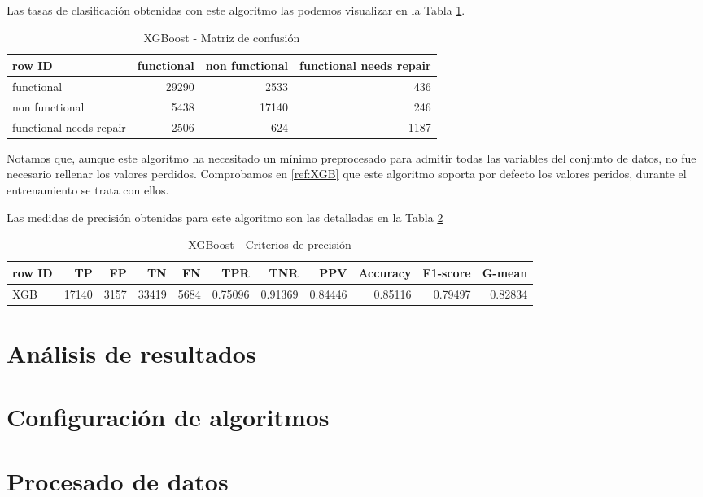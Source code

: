 \documentclass[a4paper, 20pt]{article}
\begin{document}
Las tasas de clasificación obtenidas con este algoritmo las podemos visualizar en la Tabla \ref{tab:CMXGB}.

\begin{table}[H]
  \centering
  \caption{XGBoost - Matriz de confusión}
  \label{tab:CMXGB} 
  \begin{tabular}{lrrr}
    \toprule
    row ID & functional & non functional & functional needs repair\\ \midrule
    functional & 29290 & 2533 & 436\\
    non functional & 5438 & 17140 & 246\\
    functional needs repair & 2506 & 624 & 1187\\
    \bottomrule
  \end{tabular}
\end{table}

Notamos que, aunque este algoritmo ha necesitado un mínimo preprocesado para admitir todas las variables del conjunto de datos, no fue necesario rellenar los valores perdidos. Comprobamos en \ref{ref:XGB} que este algoritmo soporta por defecto los valores peridos, durante el entrenamiento se trata con ellos.

Las medidas de precisión obtenidas para este algoritmo son las detalladas en la Tabla \ref{tab:XGB}

\begin{table}[H]
\centering
\caption{XGBoost - Criterios de precisión}
\label{tab:XGB}
\begin{tabular}{lrrrrrrrrrr}
\toprule
row ID & TP & FP & TN & FN & TPR & TNR & PPV & Accuracy & F1-score & G-mean\\ \midrule
XGB & 17140 & 3157 & 33419 & 5684 & 0.75096 & 0.91369 & 0.84446 & 0.85116 & 0.79497 & 0.82834\\
\bottomrule
\end{tabular}
\end{table}

\section{Análisis de resultados}

\section{Configuración de algoritmos}

\section{Procesado de datos}
\label{Preprocesado}
\end{document}
